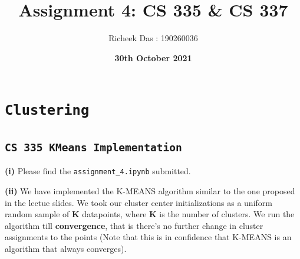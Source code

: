 \documentclass[11pt]{article}
\title{Assignment 4: CS 335 \& CS 337}
\author{Richeek Das : 190260036}
\date{\textbf{30th October 2021}}
\begin{document}
\maketitle

\pagestyle{fancy}
\fancyhf{}
\renewcommand{\footrulewidth}{1pt}

\renewcommand{\labelenumi}{(\alph{enumi})}
\renewcommand{\labelenumii}{(\arabic{enumii})}

\tableofcontents

\clearpage

\section{\texttt{Clustering}}

\subsection{\texttt{CS 335 KMeans Implementation}}

\textbf{(i)} Please find the \texttt{assignment\_4.ipynb} submitted.


\medskip
\textbf{(ii)} We have implemented the K-MEANS algorithm similar to the one proposed in the lectue slides. We took our cluster center initializations as a uniform random sample of \textbf{K} datapoints, where \textbf{K} is the number of clusters. We run the algorithm till \textbf{convergence}, that is there's no further change in cluster assignments to the points (Note that this is in confidence that K-MEANS is an algorithm that always converges).
\end{document}
